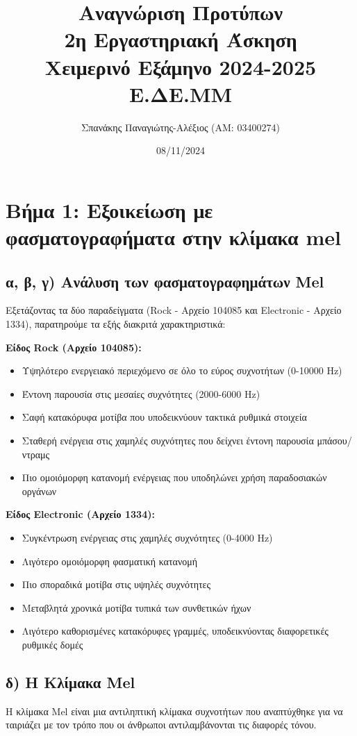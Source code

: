 \documentclass[a4paper,12pt]{article}
\title{Αναγνώριση Προτύπων \\ 2η Εργαστηριακή Άσκηση \\ Χειμερινό Εξάμηνο 2024-2025 \\ Ε.ΔE.ΜΜ}
\author{Σπανάκης Παναγιώτης-Αλέξιος (ΑΜ: 03400274)}
\date{08/11/2024}
\begin{document}
\maketitle

\section*{Βήμα 1: Εξοικείωση με φασματογραφήματα στην κλίμακα mel}

\subsection*{α, β, γ) Ανάλυση των φασματογραφημάτων Mel}
Εξετάζοντας τα δύο παραδείγματα (Rock - Αρχείο 104085 και Electronic - Αρχείο 1334), παρατηρούμε τα εξής διακριτά χαρακτηριστικά:

\textbf{Είδος Rock (Αρχείο 104085):}
\begin{itemize}
    \item Υψηλότερο ενεργειακό περιεχόμενο σε όλο το εύρος συχνοτήτων (0-10000 Hz)
    \item Έντονη παρουσία στις μεσαίες συχνότητες (2000-6000 Hz)
    \item Σαφή κατακόρυφα μοτίβα που υποδεικνύουν τακτικά ρυθμικά στοιχεία
    \item Σταθερή ενέργεια στις χαμηλές συχνότητες που δείχνει έντονη παρουσία μπάσου/ντραμς
    \item Πιο ομοιόμορφη κατανομή ενέργειας που υποδηλώνει χρήση παραδοσιακών οργάνων
\end{itemize}

\textbf{Είδος Electronic (Αρχείο 1334):}
\begin{itemize}
    \item Συγκέντρωση ενέργειας στις χαμηλές συχνότητες (0-4000 Hz)
    \item Λιγότερο ομοιόμορφη φασματική κατανομή
    \item Πιο σποραδικά μοτίβα στις υψηλές συχνότητες
    \item Μεταβλητά χρονικά μοτίβα τυπικά των συνθετικών ήχων
    \item Λιγότερο καθορισμένες κατακόρυφες γραμμές, υποδεικνύοντας διαφορετικές ρυθμικές δομές
\end{itemize}

\subsection*{δ) Η Κλίμακα Mel}
Η κλίμακα Mel είναι μια αντιληπτική κλίμακα συχνοτήτων που αναπτύχθηκε για να ταιριάζει με τον τρόπο που οι άνθρωποι αντιλαμβάνονται τις διαφορές τόνου.
\end{document}
